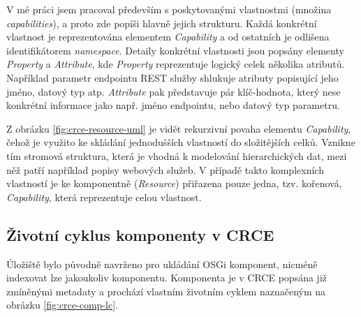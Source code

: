 \documentclass[czech,DP]{thesiskiv}
\begin{document}
V mé práci jsem pracoval především s poskytovanými vlastnostmi (množina \textit{capabilities}), a proto zde popíši hlavně jejich strukturu. Každá konkrétní vlastnost je reprezentována elementem \textit{Capability} a od ostatních je odlišena identifikátorem \textit{namespace}. Detaily konkrétní vlastnosti jsou popsány elementy \textit{Property} a \textit{Attribute}, kde \textit{Property} reprezentuje logický celek několika atributů. Například parametr endpointu REST služby shlukuje atributy popisující jeho jméno, datový typ atp. \textit{Attribute} pak představuje pár klíč-hodnota, který nese konkrétní informace jako např. jméno endpointu, nebo datový typ parametru.

Z obrázku \ref{fig:crce-resource-uml} je vidět rekurzivní povaha elementu \textit{Capability}, čehož je využito ke skládání jednodušších vlastností do složitějších celků. Vznikne tím stromová struktura, která je vhodná k modelování hierarchických dat,	mezi něž patří například popisy webových služeb. V případě takto komplexních vlastností je ke komponentně (\textit{Resource}) přiřazena pouze jedna, tzv. kořenová, \textit{Capability}, která reprezentuje celou vlastnost.


\subsection{Životní cyklus komponenty v CRCE}

Úložiště bylo původně navrženo pro ukládání OSGi komponent, nicméně indexovat lze jakoukoliv komponentu. Komponenta je v CRCE popsána již zmíněnými metadaty a prochází vlastním životním cyklem naznačeným na obrázku \ref{fig:crce-comp-lc}.
\end{document}
